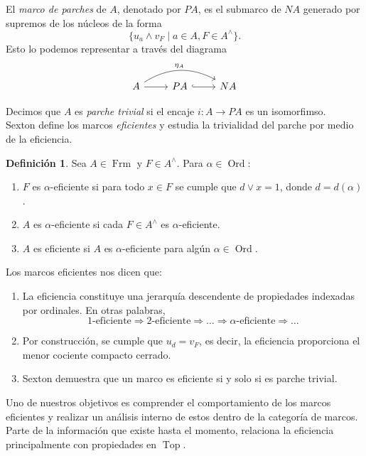 \documentclass[11pt]{amsart}
\DeclareMathOperator{\Ord}{Ord}
\DeclareMathOperator{\Frm}{Frm}
\DeclareMathOperator{\Top}{Top}
\theoremstyle{plain}
\theoremstyle{definition}
\newtheorem{dfn}[thm]{Definición}
\begin{document}
El \emph{marco de parches} de $A$, denotado por $PA$, es el submarco de $NA$ generado por supremos de los núcleos de la forma
\[
\{u_a\wedge v_F\mid a\in A, F\in A^\wedge\}. 
\]
Esto lo podemos representar a través del diagrama
\[\begin{tikzcd}
A \arrow[r] \arrow[rr, "\eta_A", bend left] & PA \arrow[r, hook] & NA
\end{tikzcd}\]

Decimos que $A$ es \emph{parche trivial} si el encaje $i\colon A\to PA$ es un isomorfimso.\\

Sexton define los marcos \emph{eficientes} y estudia la trivialidad del parche por medio de la eficiencia.

\begin{dfn}\label{eficientes}
Sea $A\in \Frm$ y $F\in A^\wedge$. Para $\alpha\in \Ord$:
\begin{enumerate}
\item $F$ es $\alpha$-eficiente si para todo $x\in F$ se cumple que $d\vee x=1$, donde $d=d(\alpha)$.
\item $A$ es $\alpha$-eficiente si cada $F\in A^\wedge$ es $\alpha$-eficiente.
\item $A$ es eficiente si $A$ es $\alpha$-eficiente para algún $\alpha\in \Ord$.
\end{enumerate}
\end{dfn}

Los marcos eficientes nos dicen que:
\begin{enumerate}
    \item La eficiencia constituye una jerarquía descendente de propiedades indexadas por ordinales. En otras palabras,
    \[
    1\text{-eficiente}\Rightarrow 2\text{-eficiente}\Rightarrow\dots\Rightarrow \alpha\text{-eficiente}\Rightarrow \dots
    \]
    \item Por construcción, se cumple que $u_d=v_F$, es decir, la eficiencia proporciona el menor cociente compacto cerrado.
    \item Sexton demuestra que un marco es eficiente si y solo si es parche trivial.
\end{enumerate}

Uno de nuestros objetivos es comprender el comportamiento de los marcos eficientes y realizar un análisis interno de estos dentro de la categoría de marcos.
Parte de la información que existe hasta el momento, relaciona la eficiencia principalmente con propiedades en $\Top$.\\
\end{document}
